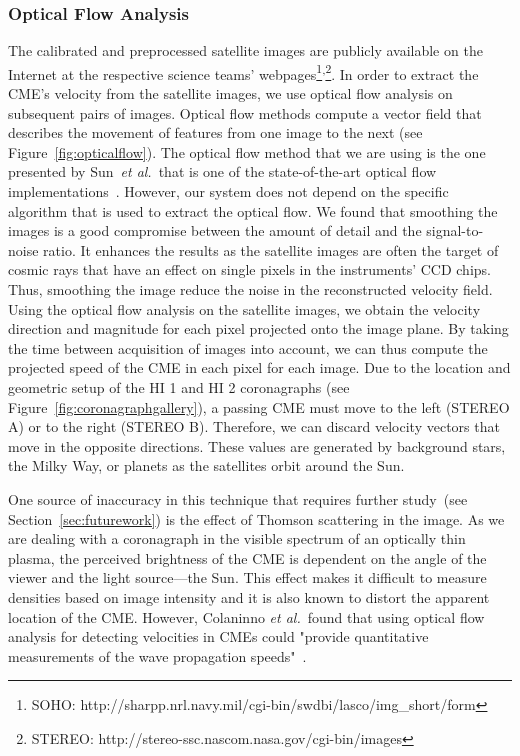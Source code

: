 \documentclass[journal]{vgtc}                %
\def\etal{\textit{et al.}}
\def\etal{\textit{et al.}}
\begin{document}
\subsubsection{Optical Flow Analysis} \label{sec:opticalflow}
The calibrated and preprocessed satellite images are publicly available on the Internet at the respective science teams' webpages\footnote{SOHO: http://sharpp.nrl.navy.mil/cgi-bin/swdbi/lasco/img\_short/form}\textsuperscript{,}\footnote{STEREO: http://stereo-ssc.nascom.nasa.gov/cgi-bin/images}. In order to extract the CME's velocity from the satellite images, we use optical flow analysis on subsequent pairs of images. Optical flow methods compute a vector field that describes the movement of features from one image to the next (see Figure~\ref{fig:opticalflow}). The optical flow method that we are using is the one presented by Sun~\etal\ that is one of the state-of-the-art optical flow implementations~\cite{sun2010secrets}. However, our system does not depend on the specific algorithm that is used to extract the optical flow. We found  that smoothing the images is a good compromise between the amount of detail and the signal-to-noise ratio.  It enhances the results as the satellite images are often the target of cosmic rays that have an effect on single pixels in the instruments' CCD chips. Thus, smoothing the image reduce the noise in the reconstructed velocity field. Using the optical flow analysis on the satellite images, we obtain the velocity direction and magnitude for each pixel projected onto the image plane. By taking the time between acquisition of images into account, we can thus compute the projected speed of the CME in each pixel for each image. Due to the location and geometric setup of the HI 1 and HI 2 coronagraphs (see Figure~\ref{fig:coronagraphgallery}), a passing CME must move to the left (STEREO A) or to the right (STEREO B). Therefore, we can discard velocity vectors that move in the opposite directions. These values are generated by background stars, the Milky Way, or planets as the satellites orbit around the Sun.

One source of inaccuracy in this technique that requires further study~(see Section~\ref{sec:futurework}) is the effect of Thomson scattering in the image. As we are dealing with a coronagraph in the visible spectrum of an optically thin plasma, the perceived brightness of the CME is dependent on the angle of the viewer and the light source---the Sun. This effect makes it difficult to measure densities based on image intensity and it is also known to distort the apparent location of the CME. However, Colaninno \etal\ found that using optical flow analysis for detecting velocities in CMEs could "provide quantitative measurements of the wave propagation speeds"~\cite{Colaninno:2006ef}.
\end{document}
